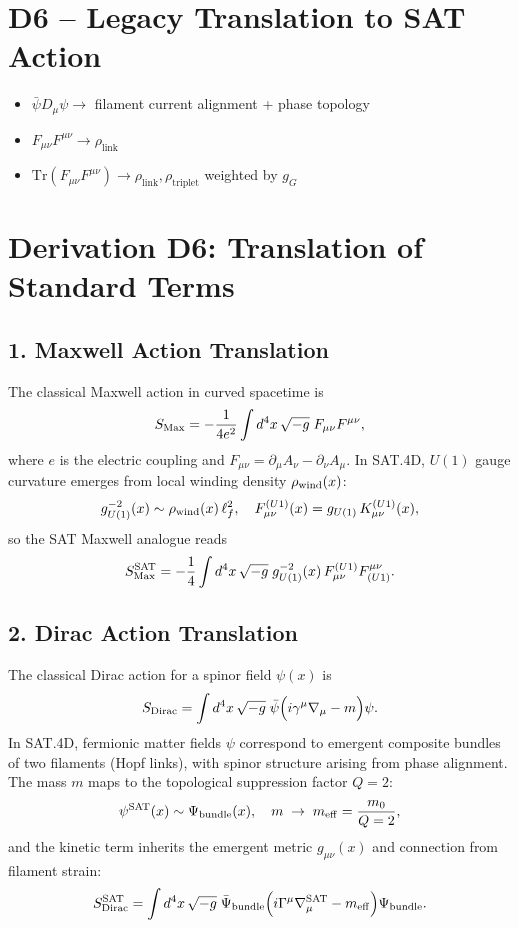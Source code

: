 \section*{D6 – Legacy Translation to SAT Action}
\begin{itemize}
  \item \( \bar\psi D_\mu \psi \rightarrow \) filament current alignment + phase topology
  \item \( F_{\mu\nu} F^{\mu\nu} \rightarrow \rho_{\text{link}} \)
  \item \( \text{Tr}(F_{\mu\nu} F^{\mu\nu}) \rightarrow \rho_{\text{link}}, \rho_{\text{triplet}} \) weighted by \( g_G \)
\end{itemize}


\section*{Derivation D6: Translation of Standard Terms}

\subsection*{1. Maxwell Action Translation}
The classical Maxwell action in curved spacetime is
\[
S_{\rm Max} = -\frac{1}{4e^2}\int d^4x\,\sqrt{-g}\;F_{\mu\nu}F^{\mu\nu},
\]
where \(e\) is the electric coupling and \(F_{\mu\nu} = \partial_\mu A_\nu - \partial_\nu A_\mu\).
In SAT.4D, \(U(1)\) gauge curvature emerges from local winding density \(\rho_{\rm wind}(x)\):
\[
g_{U(1)}^{-2}(x) \sim \rho_{\rm wind}(x)\,\ell_f^2,
\quad
F_{\mu\nu}^{(U1)}(x) = g_{U(1)}\,K_{\mu\nu}^{(U1)}(x),
\]
so the SAT Maxwell analogue reads
\[
S_{\rm Max}^{\rm SAT} 
= -\frac{1}{4}\int d^4x\,\sqrt{-g}\;g_{U(1)}^{-2}(x)\,
F_{\mu\nu}^{(U1)}F^{\mu\nu}_{(U1)}.
\]

\subsection*{2. Dirac Action Translation}
The classical Dirac action for a spinor field \(\psi(x)\) is
\[
S_{\rm Dirac}
= \int d^4x\,\sqrt{-g}\;\bar\psi\Bigl(i\gamma^\mu\nabla_\mu - m\Bigr)\psi.
\]
In SAT.4D, fermionic matter fields \(\psi\) correspond to emergent composite bundles
of two filaments (Hopf links), with spinor structure arising from phase alignment.  The
mass \(m\) maps to the topological suppression factor \(Q=2\):
\[
\psi^{\rm SAT}(x)\sim\Psi_{\rm bundle}(x), 
\quad
m \;\rightarrow\; m_{\rm eff} = \frac{m_0}{Q=2},
\]
and the kinetic term inherits the emergent metric \(g_{\mu\nu}(x)\) and connection from
filament strain:
\[
S_{\rm Dirac}^{\rm SAT}
= \int d^4x\,\sqrt{-g}\;\bar\Psi_{\rm bundle}\Bigl(i\Gamma^\mu\nabla_\mu^{\rm SAT}
- m_{\rm eff}\Bigr)\Psi_{\rm bundle}.
\]

